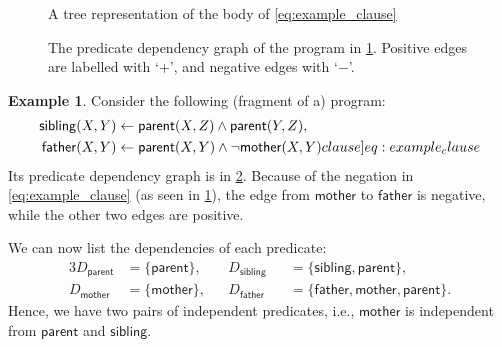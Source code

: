 \documentclass[letterpaper]{article}
\theoremstyle{definition}
\newtheorem{example}{Example}
\begin{document}
\begin{figure}
  \centering
  \caption{A tree representation of the body of \cref{eq:example_clause}}
  \label{fig:example_tree2}
\end{figure}
\begin{figure}
  \centering
  \caption{The predicate dependency graph of the program in \cref{ex:program}.
    Positive edges are labelled with `$+$', and negative edges with `$-$'.}
  \label{fig:predicate_dependencies}
\end{figure}

\begin{example} \label{ex:program}
  Consider the following (fragment of a) program:
  \begin{align}
    \mathsf{sibling}(X, Y) &\gets \mathsf{parent}(X, Z) \land \mathsf{parent}(Y, Z), \nonumber \\
    \mathsf{father}(X, Y) &\gets \mathsf{parent}(X, Y) \land \neg\mathsf{mother}(X, Y) \label[clause]{eq:example_clause}
  \end{align}
  Its predicate dependency graph is in \cref{fig:predicate_dependencies}.
  Because of the negation in \cref{eq:example_clause} (as seen in
  \cref{fig:example_tree2}), the edge from $\mathsf{mother}$ to
  $\mathsf{father}$ is negative, while the other two edges are positive.

  We can now list the dependencies of each predicate:
  \begin{alignat*}{3}
    D_{\mathsf{parent}} &= \{ \mathsf{parent} \}, && D_{\mathsf{sibling}}
    &&= \{\mathsf{sibling}, \mathsf{parent} \},\\
    D_{\mathsf{mother}} &= \{ \mathsf{mother} \}, && D_{\mathsf{father}}
    &&= \{ \mathsf{father}, \mathsf{mother}, \mathsf{parent} \}.
  \end{alignat*}
  Hence, we have two pairs of independent predicates, i.e., $\mathsf{mother}$ is
  independent from $\mathsf{parent}$ and $\mathsf{sibling}$.
\end{example}
\end{document}
